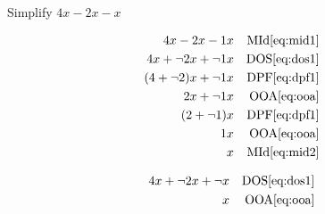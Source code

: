 \documentclass[20150903-160354-rs2.2-MarksMathNotebook.tex]{subfiles}
\begin{document}
\begin{example}[id:20141106-152020] \label{20141106-152020}  \hfill \\

Simplify $4x-2x-x$

\soln

\solnsteps
\begin{align*}
4x-2x-1x && \text{MId} \eqref{eq:mid1} \\
4x+\neg 2x + \neg 1 x && \text{DOS} \eqref{eq:dos1} \\
(4+\neg 2)x + \neg 1x && \text{DPF} \eqref{eq:dpf1} \\
2x+\neg 1x && \text{OOA} \eqref{eq:ooa} \\
(2+\neg 1)x && \text{DPF} \eqref{eq:dpf1} \\
1x && \text{OOA} \eqref{eq:ooa} \\
x && \text{MId} \eqref{eq:mid2}
\end{align*}

\soln

\lesssteps
\begin{align*}
4x + \neg 2x + \neg x && \text{DOS} \eqref{eq:dos1} \\
x && \text{OOA} \eqref{eq:ooa}
\end{align*}
\end{example}
\end{document}
